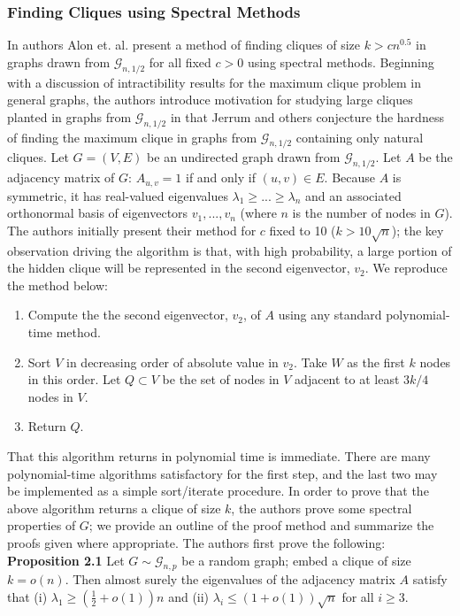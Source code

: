 \documentclass{article}
\theoremstyle{definition}
\begin{document}
\subsubsection{Finding Cliques using Spectral Methods}

In \cite{Spectral} authors Alon et. al. present a method of finding cliques 
of size $k > c n^{0.5}$ in graphs drawn from $\mathcal{G}_{n,1/2}$ 
for all fixed $c > 0$ using spectral methods.  Beginning with a 
discussion of intractibility results for the maximum clique problem in 
general graphs, the authors introduce motivation for studying large 
cliques planted in graphs from $\mathcal{G}_{n, 1/2}$ in that Jerrum 
\cite{Metropolis} and others conjecture the hardness of finding the maximum 
clique in graphs from $\mathcal{G}_{n,1/2}$ containing only natural cliques. 
\newline\newline
Let $G=(V,E)$ be an undirected  graph drawn from $\mathcal{G}_{n,1/2}$.  
Let $A$ be the adjacency matrix of $G$: $A_{u,v}=1$ if and only if $(u,v) \in E$.
Because $A$ is symmetric, it has real-valued eigenvalues 
$\lambda_1 \geq ... \geq \lambda_n$ and an associated orthonormal basis of 
eigenvectors $v_1,...,v_n$ (where $n$ is the number of nodes in $G$).
The authors initially present their method for $c$ fixed to 10
($k > 10 \sqrt{n}$); the 
key observation driving the algorithm is that, with high probability, a 
large portion of the hidden clique will be represented in the second 
eigenvector, $v_2$.  We reproduce the method below:

\begin{enumerate}
\item{Compute the the second eigenvector, $v_2$, of $A$ using any 
standard polynomial-time method.}
\item{Sort $V$ in decreasing order of absolute value in $v_2$.  Take
$W$ as the first $k$ nodes in this order.  Let $Q \subset V$ be the set 
of nodes in $V$ adjacent to at least $3k/4$ nodes in $V$.}
\item{Return $Q$.}
\end{enumerate}

That this algorithm returns in polynomial time is immediate.  There 
are many polynomial-time algorithms satisfactory for the first step, 
and the last two may be implemented as a simple sort/iterate procedure.  
In order to prove that the above algorithm returns a clique of size 
$k$, the authors prove some spectral properties of $G$; we provide an 
outline of the proof method and summarize the proofs given where appropriate.
The authors first prove the following:
\newline\newline
\noindent \textbf{Proposition 2.1 } Let $G \sim \mathcal{G}_{n,p}$ be a 
random graph; embed a clique of size $k = o(n)$.  Then almost surely 
the eigenvalues of the adjacency matrix $A$ satisfy that (i) 
$\lambda_1 \geq (\frac{1}{2} + o(1))n$ and (ii) $\lambda_i \leq (1+o(1))\sqrt{n}$
for all $i \geq 3$.
\end{document}
